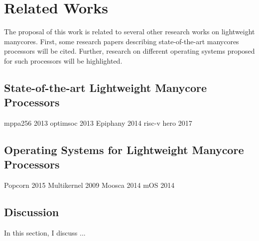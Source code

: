 \chapter{Related Works}
\label{ch.related-works}

The proposal of this work is related to several other research works
on lightweight manycores.
First, some research papers describing state-of-the-art manycores
processors will be cited. Further, research on different operating
systems proposed for such processors will be highlighted.

\section{State-of-the-art Lightweight Manycore Processors}

    mppa256 2013
    optimsoc 2013
    Epiphany 2014
    risc-v hero 2017

\section{Operating Systems for Lightweight Manycore Processors}

    Popcorn 2015
    Multikernel 2009
    Moosca 2014
    mOS 2014

\section{Discussion}
    In this section, I discuss ...